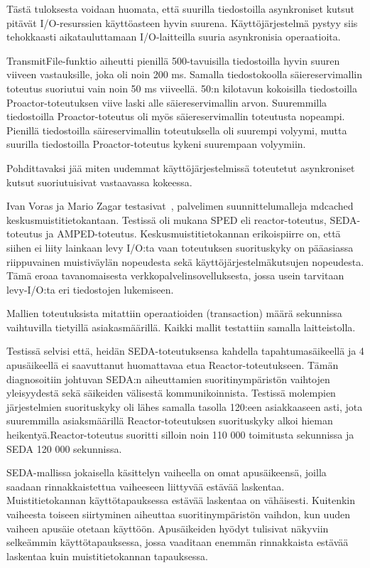 \documentclass[finnish]{tktltiki2}%
\theoremstyle{definition}
\theoremstyle{remark}
\begin{document}
Tästä tuloksesta voidaan huomata,
että suurilla tiedostoilla asynkroniset kutsut
pitävät I/O-resurssien käyttöasteen hyvin suurena.
Käyttöjärjestelmä pystyy siis tehokkaasti aikatauluttamaan
I/O-laitteilla suuria asynkronisia operaatioita.

TransmitFile-funktio aiheutti pienillä 500-tavuisilla tiedostoilla hyvin suuren viiveen
vastauksille, joka oli noin 200 ms. Samalla tiedostokoolla säiereservimallin toteutus
suoriutui vain noin 50 ms viiveellä.
50:n kilotavun kokoisilla tiedostoilla Proactor-toteutuksen
viive laski alle säiereservimallin arvon.
Suuremmilla tiedostoilla Proactor-toteutus oli myös säiereservimallin toteutusta nopeampi.
Pienillä tiedostoilla säireservimallin toteutuksella oli suurempi
volyymi, mutta suurilla tiedostoilla Proactor-toteutus
kykeni suurempaan volyymiin.

Pohdittavaksi jää miten uudemmat käyttöjärjestelmissä
toteutetut asynkroniset kutsut suoriutuisivat 
vastaavassa kokeessa.

Ivan Voras ja Mario Zagar testasivat~\cite{voras_characteristics_2009},
palvelimen suunnittelumalleja mdcached keskusmuistitietokantaan.
Testissä oli mukana SPED eli reactor-toteutus, SEDA-toteutus ja AMPED-toteutus.
Keskusmuistitietokannan erikoispiirre on, että siihen ei liity lainkaan levy I/O:ta
vaan toteutuksen suorituskyky on pääasiassa riippuvainen muistiväylän nopeudesta sekä
käyttöjärjestelmäkutsujen nopeudesta. Tämä eroaa tavanomaisesta
verkkopalvelinsovelluksesta, jossa usein tarvitaan levy-I/O:ta 
eri tiedostojen lukemiseen.

Mallien toteutuksista mitattiin operaatioiden (transaction) määrä sekunnissa vaihtuvilla tietyillä
asiakasmäärillä. Kaikki mallit testattiin samalla laitteistolla.


Testissä selvisi että, heidän SEDA-toteutuksensa kahdella tapahtumasäikeellä ja 4 apusäikeellä
ei saavuttanut huomattavaa
etua Reactor-toteutukseen. Tämän diagnosoitiin
johtuvan SEDA:n aiheuttamien suoritinympäristön vaihtojen yleisyydestä
sekä säikeiden välisestä kommunikoinnista.
Testissä molempien järjestelmien suorituskyky
oli lähes samalla tasolla 120:een asiakkaaseen asti, jota
suuremmilla asiaksmäärillä Reactor-toteutuksen suorituskyky alkoi
hieman heikentyä.Reactor-toteutus suoritti silloin noin 110 000 toimitusta sekunnissa
ja SEDA 120 000 sekunnissa.

SEDA-mallissa jokaisella käsittelyn vaiheella on omat apusäikeensä,
joilla saadaan rinnakkaistettua vaiheeseen liittyvää estävää laskentaa.
Muistitietokannan käyttötapauksessa estävää laskentaa on vähäisesti.
Kuitenkin vaiheesta toiseen siirtyminen aiheuttaa suoritinympäristön vaihdon,
kun uuden vaiheen apusäie otetaan käyttöön.
Apusäikeiden hyödyt
tulisivat näkyviin selkeämmin käyttötapauksessa, jossa vaaditaan enemmän
rinnakkaista estävää laskentaa kuin muistitietokannan tapauksessa.
\end{document}
